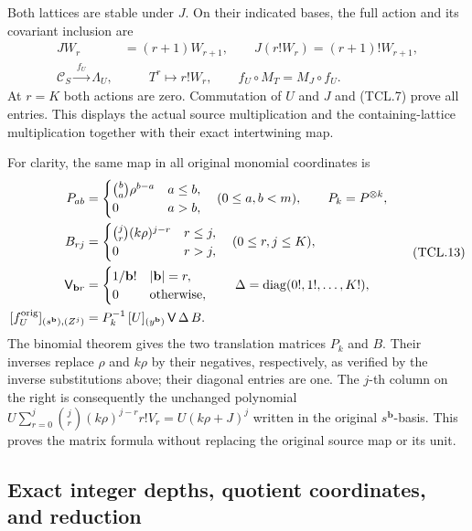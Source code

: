 Both lattices are stable under \(J\). On their indicated bases,
the full action and its covariant inclusion are
\[
 \begin{split}
 J W_r&=(r+1)W_{r+1},\qquad
 J(r!W_r)=(r+1)!W_{r+1},\\
 \mathcal C_S\xrightarrow{\ f_U\ }\Lambda_U,
 &\qquad T^r\longmapsto r!W_r,\qquad
 f_U\circ M_T=M_J\circ f_U.
 \end{split}
 \tag{TCL.12}\label{CFStage:eq:tcl-action-matrix}
\]
At \(r=K\) both actions are zero. Commutation of \(U\) and
\(J\) and (TCL.7) prove all entries. This displays the actual
source multiplication and the containing-lattice multiplication
together with their exact intertwining map.

For clarity, the same map in all original monomial coordinates is
\[
 \begin{split}
 P_{ab}&=\begin{cases}\binom ba\rho^{b-a}&a\leq b,\\0&a>b,
                 \end{cases}\quad(0\leq a,b<m),\qquad P_k=P^{\otimes k},\\
 B_{rj}&=\begin{cases}\binom jr(k\rho)^{j-r}&r\leq j,\\0&r>j,
                 \end{cases}\quad(0\leq r,j\leq K),\\
 \mathsf V_{\mathbf b r}&=
       \begin{cases}1/\mathbf b!&|\mathbf b|=r,\\0&\text{otherwise},
       \end{cases}\qquad \Delta=\operatorname{diag}(0!,1!,\ldots,K!),\\
 [f_U^{\rm orig}]_{(s^{\mathbf b}),(Z^j)}
     &=P_k^{-1}\,[U]_{(y^{\mathbf b})}\,\mathsf V\,\Delta\,B.
 \end{split}
 \tag{TCL.13}\label{CFStage:eq:tcl-original-matrix}
\]
The binomial theorem gives the two translation matrices \(P_k\)
and \(B\). Their inverses replace \(\rho\) and \(k\rho\) by
their negatives, respectively, as verified by the inverse substitutions
above; their diagonal entries are one. The \(j\)-th column on the
right is consequently the unchanged polynomial
\(U\sum_{r=0}^j\binom jr(k\rho)^{j-r}r!V_r=U(k\rho+J)^j\)
written in the original \(s^{\mathbf b}\)-basis. This proves the
matrix formula without replacing the original source map or its unit.

\subsection{Exact integer depths, quotient coordinates, and reduction}


